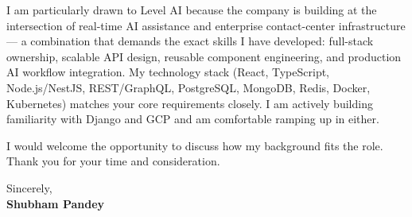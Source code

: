 \documentclass[a4paper,11pt]{article}
\begin{document}
\vspace{8pt}

\noindent I am particularly drawn to Level AI because the company is building at the intersection of real-time AI assistance and enterprise contact-center infrastructure --- a combination that demands the exact skills I have developed: full-stack ownership, scalable API design, reusable component engineering, and production AI workflow integration. My technology stack (React, TypeScript, Node.js/NestJS, REST/GraphQL, PostgreSQL, MongoDB, Redis, Docker, Kubernetes) matches your core requirements closely. I am actively building familiarity with Django and GCP and am comfortable ramping up in either.

\vspace{8pt}

\noindent I would welcome the opportunity to discuss how my background fits the role. Thank you for your time and consideration.

\vspace{14pt}

\noindent Sincerely,\\[4pt]
\textbf{Shubham Pandey}
\end{document}
